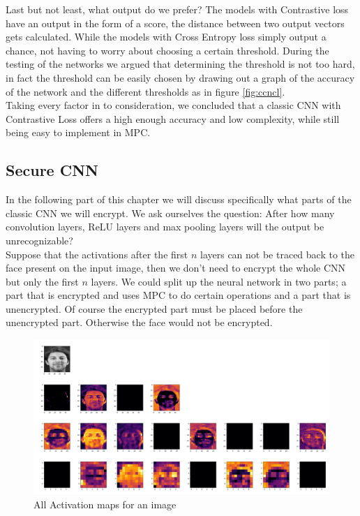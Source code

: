 Last but not least, what output do we prefer? The models with Contrastive loss have an output in the form of a score, the distance between two output vectors gets calculated. While the models with Cross Entropy loss simply output a chance, not having to worry about choosing a certain threshold. During the testing of the networks we argued that determining the threshold is not too hard, in fact the threshold can be easily chosen by drawing out a graph of the accuracy of the network and the different thresholds as in figure \ref{fig:ccncl}.\\

Taking every factor in to consideration, we concluded that a classic CNN with Contrastive Loss offers a high enough accuracy and low complexity, while still being easy to implement in MPC.\\

\subsection{Secure CNN}
\label{SecureCNN}
In the following part of this chapter we will discuss specifically what parts of the classic CNN we will encrypt. We ask ourselves the question: After how many convolution layers, ReLU layers and max pooling layers will the output be unrecognizable?\\

 Suppose that the activations after the first $n$ layers can not be traced back to the face present on the input image, then we don't need to encrypt the whole CNN but only the first $n$ layers. We could split up the neural network in two parts; a part that is encrypted and uses MPC to do certain operations and a part that is unencrypted. Of course the encrypted part must be placed before the unencrypted part. Otherwise the face would not be encrypted.

\begin{figure}[H]
  \includegraphics[scale=0.2]{fig/activations/7.png}
  \centering
  \caption{All Activation maps for an image}
  \label{fig:activations}
\end{figure}

